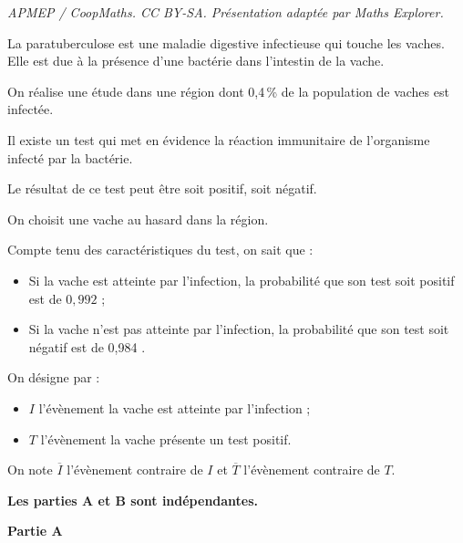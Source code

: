 \documentclass[10pt]{article}
\begin{document}
\noindent\textit{APMEP / CoopMaths. CC BY-SA. Présentation adaptée par Maths Explorer.}\par\medskip
\medskip

La paratuberculose est une maladie digestive infectieuse qui touche les vaches. Elle est due à la présence d'une bactérie dans l'intestin de la vache.

On réalise une étude dans une région dont 0,4\,\% de la population de vaches est infectée.

Il existe un test qui met en évidence la réaction immunitaire de l'organisme infecté par la bactérie.

Le résultat de ce test peut être soit \og positif\fg{}, soit \og négatif\fg{}.

On choisit une vache au hasard dans la région.

Compte tenu des caractéristiques du test, on sait que :

\begin{itemize}
\item Si la vache est atteinte par l'infection, la probabilité que son test soit positif est de $0,992$ ;
\item Si la vache n'est pas atteinte par l'infection, la probabilité que son test soit négatif est de 0,984 .
\end{itemize}

On désigne par :
	\begin{itemize}
		\item $I$ l'évènement \og{}la vache est atteinte par l'infection\fg{} ;
		\item $T$ l'évènement \og{}la vache présente un test positif\fg{}.
	\end{itemize}

On note $\overline{I}$ l'évènement contraire de $I$ et $\overline{T}$ l'évènement contraire de $T$.

\medskip

\textbf{Les parties A et B sont indépendantes.}

\bigskip

\textbf{Partie A}
\smallskip
\end{document}
